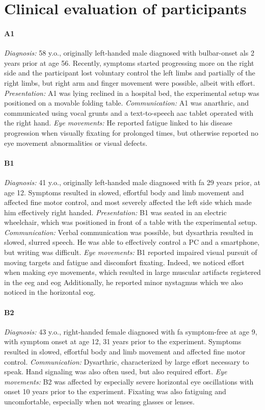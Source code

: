 \section{Clinical evaluation of participants}
\label{app:clinical-eval}

\paragraph{A1}
\emph{Diagnosis:} 58 y.o., originally left-handed male diagnosed with bulbar-onset
\ac{als} 2 years prior at age 56.
Recently, symptoms started progressing more on the right side
and the participant lost voluntary control the left limbs and partially
of the right limbs, but right arm and finger movement were possible, albeit with effort.
\emph{Presentation:} A1 was lying reclined in a hospital bed, the
experimental setup was positioned on a movable folding table.
\emph{Communication:} A1 was anarthric, and communicated using vocal
grunts and a text-to-speech \ac{aac} tablet operated with the right hand.
\emph{Eye movements:} He reported fatigue linked to his disease progression when
visually fixating for prolonged times, but otherwise reported no eye movement
abnormalities or visual defects.

\paragraph{B1}
\emph{Diagnosis:} 41 y.o., originally left-handed male diagnosed with \ac{fa}
29 years prior, at age 12.
Symptoms resulted in slowed, effortful body and limb movement and affected
fine motor control, and most severely affected the left side which made him
effectively right handed.
\emph{Presentation:} B1 was seated in an electric wheelchair, which was
positioned in front of a table with the experimental setup.
\emph{Communication:} Verbal communication was possible, but dysarthria resulted
in slowed, slurred speech.
He was able to effectively control a PC and a smartphone, but writing was difficult.
\emph{Eye movements:} B1 reported impaired visual pursuit of moving targets and
fatigue and discomfort fixating.
Indeed, we noticed effort when making eye movements, which resulted in
large muscular artifacts registered in the \ac{eeg} and \ac{eog}
Additionally, he reported minor nystagmus which we also noticed in the horizontal
\ac{eog}.

\paragraph{B2}
\emph{Diagnosis:} 43 y.o., right-handed female diagnosed with \ac{fa}
symptom-free at age 9, with symptom onset at age 12, 31 years prior to the
experiment.
Symptoms resulted in slowed, effortful body and limb movement and affected
fine motor control.
\emph{Communication:} Dysarthric, characterized by large effort necessary to speak.
Hand signaling was also often used, but also required effort.
\emph{Eye movements:} B2 was affected by especially severe horizontal eye
oscillations with onset 10 years prior to the experiment.
Fixating was also fatiguing and uncomfortable, especially when not wearing
glasses or lenses.

